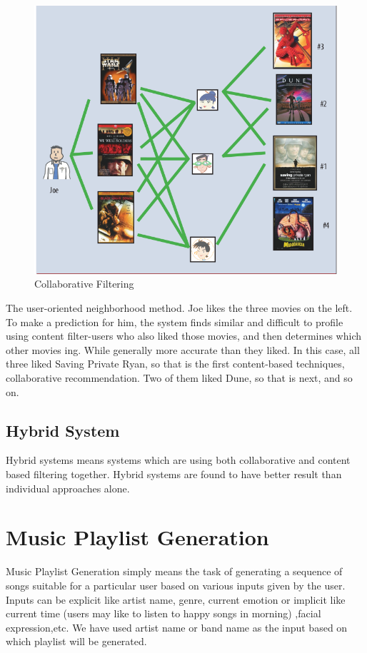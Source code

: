 \begin{figure}
\includegraphics[scale=0.4]{colab}
\caption{Collaborative Filtering\cite{mainpaper}}
\label{chap0Fig:1}
\end{figure}

The user-oriented neighborhood method. Joe likes the three movies on the left. To make a prediction for him, the system finds similar and difficult to profile using content filter-users who also liked those movies, and then determines which other movies
ing. While generally more accurate than
they liked. In this case, all three liked Saving Private Ryan, so that is the first
content-based techniques, collaborative
recommendation. Two of them liked Dune, so that is next, and so on.


\subsection{Hybrid System\cite{hybrid}}
Hybrid systems means systems which are using both collaborative and content based filtering together. Hybrid systems are found to have better result than individual approaches alone.

\section{Music Playlist Generation} \label{sec1.1}
Music Playlist Generation simply means the task of generating a sequence of songs suitable for a particular user based on various inputs  given by the user. Inputs can be explicit like artist name, genre, current emotion or implicit like current time (users may like to listen to happy songs in morning) ,facial expression,etc. We have used artist name or band name as the input based on which playlist will be generated. 


